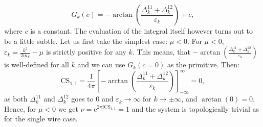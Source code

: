 \begin{equation}
G_k(c) = -\arctan\left(\frac{\Delta^{11}_k + \Delta^{12}_k }{\varepsilon_k}\right) + c, \nonumber
\end{equation}
where $c$ is a constant. The evaluation of the integral itself however turns out to be a little subtle. Let us first take the simplest case: $\mu < 0$. For $\mu < 0$, $\varepsilon_k = \frac{k^2}{2m_F} - \mu$ is strictly positive for any $k$. This means, that $-\arctan\left(\frac{\Delta^{11}_k + \Delta^{12}_k }{\varepsilon_k}\right)$ is well-defined for all $k$ and we can use $G_k(c=0)$ as the primitive. Then:
\begin{equation}
\text{CS}_{1,1} = \frac{1}{4\pi}\left[-\arctan\left(\frac{\Delta^{11}_k + \Delta^{12}_k }{\varepsilon_k}\right)\right]^{\infty}_{-\infty} = 0, \nonumber
\end{equation}
as both $\Delta^{11}_k$ and $\Delta^{12}_k$ goes to $0$ and $\varepsilon_k \to \infty$ for $k\to \pm \infty$, and $\arctan(0) = 0$. Hence, for $\mu < 0$ we get $\nu = \text{e}^{2\pi i\text{CS}_{1,1}} = 1$ and the system is topologically trivial as for the single wire case. 

